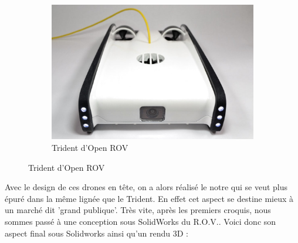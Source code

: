 \documentclass[a4paper,11pt]{report}
\begin{document}
\begin{figure}[!h]
\begin{subfigure}[b]{0.3\textwidth}
								\includegraphics[width=\textwidth]{Photos/openrov-trident-rov-2.jpg}
								\caption{Trident d'Open ROV}
							\end{subfigure}
					\end{figure}\newline\newpage
					
					Avec le design de ces drones en tête, on a alors réalisé le notre qui se veut plus épuré dans la même lignée que le Trident. En effet cet aspect se destine mieux à un marché dit 'grand publique'. Très vite, après les premiers croquis, nous sommes passé à une conception sous SolidWorks du R.O.V.. Voici donc son aspect final sous Solidworks ainsi qu'un rendu 3D : 
					
\end{document}
